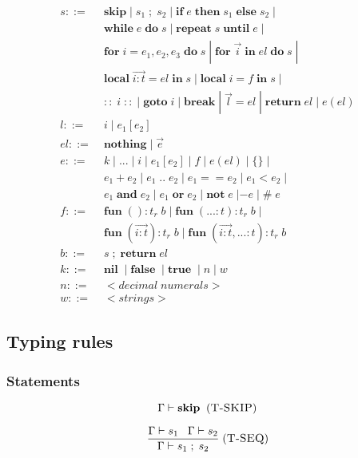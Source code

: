 \documentclass[12pt]{article}
\newcommand{\mylabel}[1]{\; (\textsc{#1})}
\newcommand{\pipe}{|\;}
\newcommand{\kw}[1]{\mathbf{#1} \;}
\newcommand{\env}{\Gamma}
\begin{document}
\begin{align*}
s ::= \; & \kw{skip} \pipe s_{1} \;;\; s_{2} \; \pipe
\kw{if} e \; \kw{then} s_{1} \; \kw{else} s_{2} \; \pipe\\
& \kw{while} e \; \kw{do} s \; \pipe
\kw{repeat} s \; \kw{until} e \; \pipe\\
& \kw{for} i=e_{1},e_{2},e_{3} \; \kw{do} s \; \pipe
\kw{for} \vec{i} \; \kw{in} el \; \kw{do} s \; \pipe\\
& \kw{local} \overrightarrow{i:t} = el \; \kw{in} s \; \pipe
\kw{local} i = f \; \kw{in} s \; \pipe\\
& \kw{::} i \; \kw{::} \pipe \kw{goto} i \; \pipe \kw{break} \pipe
\vec{l} = el \; \pipe \kw{return} el \; \pipe e(el)\\
l ::= \; & i \; \pipe e_{1}[e_{2}]\\
el ::= \; & \kw{nothing} \pipe \vec{e}\\
e ::= \; & k \; \pipe {...} \; \pipe i \; \pipe e_{1}[e_{2}] \; \pipe
f \; \pipe e(el) \; \pipe \{\} \; \pipe\\
& e_{1} + e_{2} \; \pipe e_{1} \; {..} \; e_{2} \; \pipe
e_{1} == e_{2} \; \pipe e_{1} < e_{2} \; \pipe\\
& e_{1} \; \kw{and} e_{2} \; \pipe e_{1} \; \kw{or} e_{2} \; \pipe
\kw{not} e \; | - e \; \pipe \# \; e\\
f ::= \; & \kw{fun} ():t_{r} \; b \; \pipe
\kw{fun} ({...}:t):t_{r} \; b \; \pipe\\
& \kw{fun} (\overrightarrow{i:t}):t_{r} \; b \; \pipe
\kw{fun} (\overrightarrow{i:t},{...}:t):t_{r} \; b\\
b ::= \; & s \;;\; \kw{return} el\\
k ::= \; & \kw{nil} \; \pipe \kw{false} \; \pipe \kw{true} \; \pipe
n \; \pipe w\\
n ::= \; & {<}decimal\;numerals{>}\\
w ::= \; & {<}strings{>}
\end{align*}

\subsection{Typing rules}

\subsubsection{Statements}

\[
\env \vdash \kw{skip}
\mylabel{T-SKIP}
\]

\[
\frac{\env \vdash s_{1} \;\;\;
      \env \vdash s_{2}}
     {\env \vdash s_{1} \;;\; s_{2}}
\mylabel{T-SEQ}
\]
\end{document}
